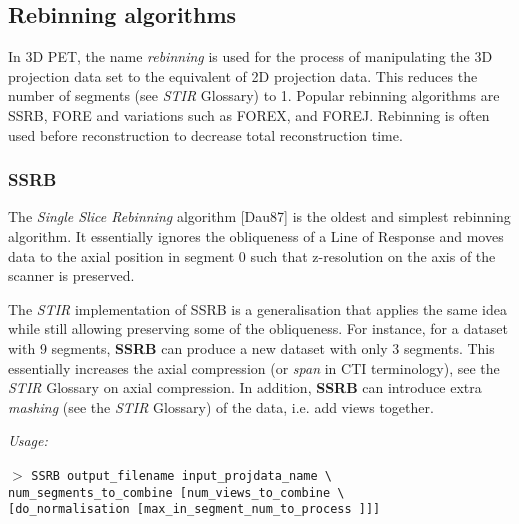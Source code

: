 \documentclass{article}
\newcommand{\cmdline}[1]{\par \noindent $>$ \texttt{#1}\par}
\begin{document}
\subsection{
Rebinning algorithms}

In 3D PET, the name \textit{rebinning} is used for the 
process of manipulating the 3D projection data set to the equivalent 
of 2D projection data. This reduces the number of segments (see 
\textit{STIR} Glossary) to 1. Popular rebinning algorithms are SSRB, FORE 
and variations such as FOREX, and FOREJ. Rebinning is often used 
before reconstruction to decrease total reconstruction time.


\subsubsection{
SSRB}
\label{sec:SSRB}
The \textit{Single Slice Rebinning} algorithm [Dau87] is the oldest 
and simplest rebinning algorithm. It essentially ignores the 
obliqueness of a Line of Response and moves data to the axial 
position in segment 0 such that z-resolution on the axis of the 
scanner is preserved.


The \textit{STIR} implementation of SSRB is a generalisation that applies 
the same idea while still allowing preserving some of the obliqueness. 
For instance, for a dataset with 9 segments, \textbf{SSRB} can produce 
a new dataset with only 3 segments. This essentially increases 
the axial compression (or \textit{span} in CTI terminology), see the 
\textit{STIR} Glossary on axial compression. In addition, \textbf{SSRB} can 
introduce extra \textit{mashing} (see the \textit{STIR} Glossary) of the data, 
i.e. add views together.


\textit{Usage:}

\cmdline{SSRB output\_filename input\_projdata\_name {\textbackslash} \\
num\_segments\_to\_combine [num\_views\_to\_combine {\textbackslash}\\
{[}do\_normalisation [max\_in\_segment\_num\_to\_process ]]]}
\end{document}
